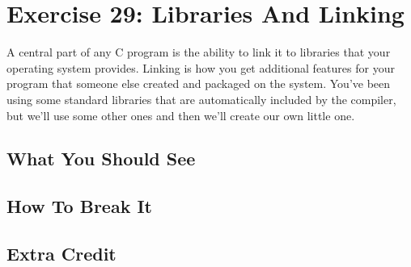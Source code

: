 \chapter{Exercise 29: Libraries And Linking}

A central part of any C program is the ability to link it to libraries that
your operating system provides.  Linking is how you get additional features
for your program that someone else created and packaged on the system.  You've
been using some standard libraries that are automatically included by the 
compiler, but we'll use some other ones and then we'll create our own little
one.

\section{What You Should See}


\section{How To Break It}


\section{Extra Credit}



